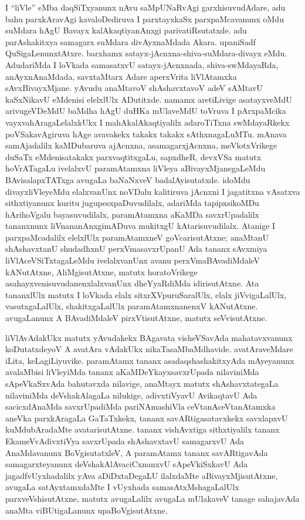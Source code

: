 I ``liVle'' eMba daqSiTxyanunx nAvu saMpUNaRvAgi garxhisuvudAdare, adu bahu parxkAravAgi kavaloDediruva I parxtayxkaSx parxpaMcavanunx oMdu suMdara hAgU Bavayx kalAkaqtiyanAnxgi parivatiRsutatxde. adu parAshakitxya samagarx suMdara divAyxnaMdada Akara. upaniSadf QuSigaLenunxtAtxre. barxhamx satayx-jAcnxna-shiva-suMdara-divayx eMdu. AdudariMda I loVkada samasatxvU satayx-jAcnxnada, shiva-swMdayaRda, anAyxnAnaMdada, savxtaMtarx Adare aperxVrita liVlAtamxka sAvxBivayxMjane. yAvudu anaMtavoV shAshavxtavoV adeV sAMtavU kaSxNikavU eMdenisi elelxlUlx ADutitxde. namamx aretiLivige asatayxveMdU arivugeVDeMdU baMdha hAgU duHKa mUlaveMdU toVruva I pArxpaMcika vayxvahAragaLelalxkUkx I mahAkalAkaqtiyalilx adaroTiTxna swMdayaRkekx poVSakavAgiruva hAge avavakekx takakx takakx sAthxnagaLuMTu. mAnava samAjadalilx kaMDubaruva ajAcnxna, asamagarxjAcnxna, meVlotxVrikege duSaTx eMdenisatakakx parxvaqtitxgaLu, sapxdheR, devxVSa matutx hoVrATagaLu ivelalxvU paramAtamxna liVleya aBivayxMjanegaLeMdu BAvisalapxTATxga avugaLa baNaNxveV badalAyisutatxde. idoMdu divayxliVleyeMdu elalxvanUnx noVDalu kalitiruva jAcnxni I jagatitxna vAsatxva sithxtiyanunx kuritu jugupesxpaDuvudilalx, adariMda tapipxsikoMDu hArihoVgalu bayasuvudilalx, paramAtamxna aKaMDa savxrUpadalilx tananxnunx liVnananAnxgimADuva mukitxgU kAtarisuvudilalx. Atanige I parxpaMcadalilx elelxlUlx paramAtamxneV goVcarisutAtxne; anaMtanU shAshavxtanU shudadhxnU perxVmasavxrUpanU Ada tananx sAvxmiya liVlAceVSiTxtagaLeMdu ivelalxvanUnx avanu perxVmaBAvadiMdaleV kANutAtxne, AliMgisutAtxne, matutx horatoVrikege asahayxvenisuvudanenxlalxvanUnx dheYyaRdiMda idirisutAtxne. Ata tananxlUlx matutx I loVkada elalx sitxrXVpuruSaralUlx, elalx jiVvigaLalUlx, vasutxgaLalUlx, shakitxgaLalUlx paramAtamxnanenxV kANutAtxne. avugaLanunx A BAvadiMdaleV pirxVtisutAtxne, matutx seVvisutAtxne.

liVlAvAdakUkx matutx yAvudakekx BAgavata visheVSavAda mahatavxvanunx koDu\-tatxdeyoV A avatAra vAdakUkx nikaTasaMbaMdhavide. avatAraveMdare iLita, keLagiLiyuvike. paramAtamx tananx asadaqshashakitxyAda mAyeyanunx avalaMbisi liVleyiMda tananx aKaMDeYkayxsavxrUpada nilaviniMda sApeVkaSxvAda bahutavxda nilavige, anaMtayx matutx shAshavxtategaLa nilaviniMda deVshakAlagaLa nilukige, adivxtiVyavU AvikaqtavU Ada sacicxdAnaMda savxrUpadiMda pariNAmashiVla ceVtanAceVtanAtamxka aneVka parxkAragaLa GaTaTxkekx, tananx savARtigasatavxkekx savxlapxvU kuMdubAradaMte avatarisutAtxne. tananx vishAvxtiga sithxtiyalilx tananx EkameVvAdivxtiVya savxrUpada shAshavxtavU samagarxvU Ada AnaMdavanunx BoVgisutatxleV, A paramAtamx tananx savARtigavAda samagarxteyanunx deVshakAlAvaciCxnanxvU sApeVkiSxkavU Ada jagadfvUyxhadalilx yAva aDiDxtaDegaLU ilalxdaMte aBivayxMjisutAtxne, avugaLa satAyxtamxdaMte I vUyxhada samasAtxMshagaLalUlx parxveVshisutAtxne, matutx avugaLalilx avugaLa mUlakaveV tanage sahajavAda anaMta viBUtigaLanunx upaBoVgisutAtxne.


